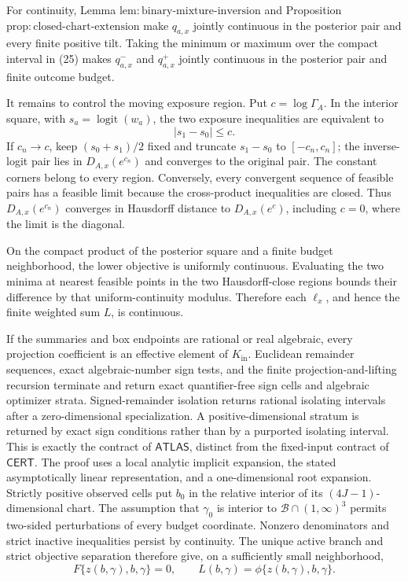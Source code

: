 For continuity, Lemma \(\mathrm{lem{:}binary\text{-}mixture\text{-}inversion}\) and Proposition \(\mathrm{prop{:}closed\text{-}chart\text{-}extension}\) make \(q_{a,x}\) jointly continuous in the posterior pair and every finite positive tilt.  Taking the minimum or maximum over the compact interval in (25) makes \(q^-_{a,x}\) and \(q^+_{a,x}\) jointly continuous in the posterior pair and finite outcome budget.

It remains to control the moving exposure region.  Put \(c=\log\Gamma_A\).  In the interior square, with \(s_a=\operatorname{logit}(w_a)\), the two exposure inequalities are equivalent to
\[
 |s_1-s_0|\leq c.                                                       \tag{27}
\]
If \(c_n\to c\), keep \((s_0+s_1)/2\) fixed and truncate \(s_1-s_0\) to \([ -c_n,c_n]\); the inverse-logit pair lies in \(D_{A,x}(e^{c_n})\) and converges to the original pair.  The constant corners belong to every region.  Conversely, every convergent sequence of feasible pairs has a feasible limit because the cross-product inequalities are closed.  Thus \(D_{A,x}(e^{c_n})\) converges in Hausdorff distance to \(D_{A,x}(e^c)\), including \(c=0\), where the limit is the diagonal.

On the compact product of the posterior square and a finite budget neighborhood, the lower objective is uniformly continuous.  Evaluating the two minima at nearest feasible points in the two Hausdorff-close regions bounds their difference by that uniform-continuity modulus.  Therefore each \(\ell_x\), and hence the finite weighted sum \(L\), is continuous.

If the summaries and box endpoints are rational or real algebraic, every projection coefficient is an effective element of \(K_{\mathrm{in}}\).  Euclidean remainder sequences, exact algebraic-number sign tests, and the finite projection-and-lifting recursion terminate and return exact quantifier-free sign cells and algebraic optimizer strata.  Signed-remainder isolation returns rational isolating intervals after a zero-dimensional specialization.  A positive-dimensional stratum is returned by exact sign conditions rather than by a purported isolating interval.  This is exactly the contract of \(\mathsf{ATLAS}\), distinct from the fixed-input contract of \(\mathsf{CERT}\).
The proof uses a local analytic implicit expansion, the stated asymptotically linear representation, and a one-dimensional root expansion.  Strictly positive observed cells put \(b_0\) in the relative interior of its \((4J-1)\)-dimensional chart.  The assumption that \(\gamma_0\) is interior to \(\mathcal B\cap(1,\infty)^3\) permits two-sided perturbations of every budget coordinate.  Nonzero denominators and strict inactive inequalities persist by continuity.  The unique active branch and strict objective separation therefore give, on a sufficiently small neighborhood,
\[
 F\{z(b,\gamma),b,\gamma\}=0,
 \qquad
 L(b,\gamma)=\phi\{z(b,\gamma),b,\gamma\}.                             \tag{28}
\]

